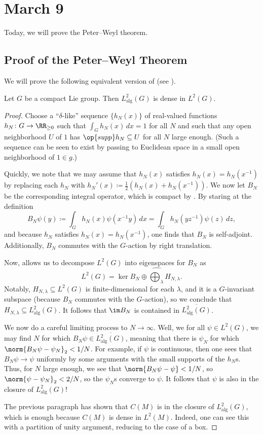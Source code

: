 \documentclass[../notes.tex]{subfiles}
\begin{document}
\section{March 9}
Today, we will prove the Peter--Weyl theorem.

\subsection{Proof of the Peter--Weyl Theorem}
We will prove the following equivalent version of  (see ).
\begin{theorem}
	Let $G$ be a compact Lie group. Then $L^2_{\mathrm{alg}}(G)$ is dense in $L^2(G)$.
\end{theorem}
\begin{proof}
	Choose a ``$\delta$-like'' sequence $\{h_N(x)\}$ of real-valued functions $h_N\colon G\to\RR_{\ge0}$ such that $\int_Gh_N(x)\,dx=1$ for all $N$ and such that any open neighborhood $U$ of $1$ has $\op{supp}h_N\subseteq U$ for all $N$ large enough. (Such a sequence can be seen to exist by passing to Euclidean space in a small open neighborhood of $1\in g$.)

	Quickly, we note that we may assume that $h_N(x)$ satisfies $h_N\left(x\right)=h_N\left(x^{-1}\right)$ by replacing each $h_N$ with $h_N'(x)\coloneqq\frac12\left(h_N(x)+h_N\left(x^{-1}\right)\right)$. We now let $B_N$ be the corresponding integral operator, which is compact by . By staring at the definition
	\[B_N\psi(y)\coloneqq\int_Gh_N(x)\psi\left(x^{-1}y\right)\,dx=\int_Gh_N\left(yz^{-1}\right)\psi(z)\,dz,\]
	and because $h_N$ satisfies $h_N(x)=h_N\left(x^{-1}\right)$, one finds that $B_N$ is self-adjoint. Additionally, $B_N$ commutes with the $G$-action by right translation.

	Now,  allows us to decompose $L^2(G)$ into eigenspaces for $B_N$ as
	\[L^2(G)=\ker B_N\oplus\widehat{\bigoplus_\lambda}H_{N,\lambda}.\]
	Notably, $H_{N,\lambda}\subseteq L^2(G)$ is finite-dimensional for each $\lambda$, and it is a $G$-invariant subspace (because $B_N$ commutes with the $G$-action), so we conclude that $H_{N,\lambda}\subseteq L^2_{\mathrm{alg}}(G)$. It follows that $\im B_N$ is contained in $\overline{L^2_{\mathrm{alg}}(G)}$.

	We now do a careful limiting process to $N\to\infty$. Well, we for all $\psi\in L^2(G)$, we may find $N$ for which $B_N\psi\in\overline{L^2_{\mathrm{alg}}(G)}$, meaning that there is $\psi_N$ for which $\norm{B_N\psi-\psi_N}_2<1/N$. For example, if $\psi$ is continuous, then one sees that $B_N\psi\to\psi$ uniformly by some arguments with the small supports of the $h_N$s. Thus, for $N$ large enough, we see that $\norm{B_N\psi-\psi}<1/N$, so $\norm{\psi-\psi_N}_2<2/N$, so the $\psi_N$s converge to $\psi$. It follows that $\psi$ is also in the closure of $L^2_{\mathrm{alg}}(G)$!

	The previous paragraph has shown that $C(M)$ is in the closure of $L^2_{\mathrm{alg}}(G)$, which is enough because $C(M)$ is dense in $L^2(M)$. Indeed, one can see this with a partition of unity argument, reducing to the case of a box.
\end{proof}
\end{document}
